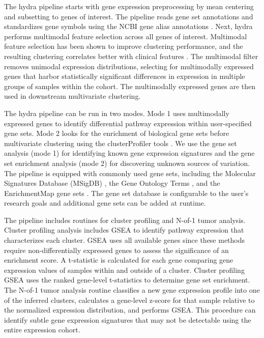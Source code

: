 \documentclass[10pt,letterpaper]{article}
\begin{document}
The hydra pipeline starts with gene expression preprocessing by mean centering and subsetting to genes of interest. The pipeline reads gene set annotations and standardizes gene symbols using the NCBI gene alias annotations \cite{benson2012genbank}. Next, hydra performs multimodal feature selection across all genes of interest. Multimodal feature selection has been shown to improve clustering performance, and the resulting clustering correlates better with clinical features \cite{yiliMultimodalityCriterionFeature2005}. The multimodal filter removes unimodal expression distributions, selecting for multimodally expressed genes that harbor statistically significant differences in expression in multiple groups of samples within the cohort. The multimodally expressed genes are then used in downstream multivariate clustering.

The hydra pipeline can be run in two modes. Mode 1 uses multimodally expressed genes to identify differential pathway expression within user-specified gene sets. Mode 2 looks for the enrichment of biological gene sets before multivariate clustering using the clusterProfiler tools \cite{yuClusterProfilerPackageComparing2012}. We use the gene set analysis (mode 1) for identifying known gene expression signatures and the gene set enrichment analysis (mode 2) for discovering unknown sources of variation. The pipeline is equipped with commonly used gene sets, including the Molecular Signatures Database (MSigDB) \cite{liberzonMolecularSignaturesDatabase2011}, the Gene Ontology Terms \cite{ashburnerGeneOntologyTool2000, gene2018gene}, and the EnrichmentMap gene sets \cite{merico2010enrichment}. The gene set database is configurable to the user’s research goals and additional gene sets can be added at runtime.

The pipeline includes routines for cluster profiling and N-of-1 tumor analysis. Cluster profiling analysis includes GSEA to identify pathway expression that characterizes each cluster. GSEA uses all available genes since these methods require non-differentially expressed genes to assess the significance of an enrichment score. A t-statistic is calculated for each gene comparing gene expression values of samples within and outside of a cluster. Cluster profiling GSEA uses the ranked gene-level t-statistics to determine gene set enrichment. The N-of-1 tumor analysis routine classifies a new gene expression profile into one of the inferred clusters, calculates a gene-level z-score for that sample relative to the normalized expression distribution, and performs GSEA. This procedure can identify subtle gene expression signatures that may not be detectable using the entire expression cohort.
\end{document}
